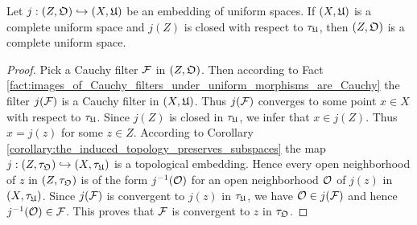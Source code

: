 \begin{theorem}\label{theorem:closed_embeddings_into_complete_space_are_complete}
Let $j:\left(Z,{\mathfrak O} \right) \hookrightarrow \left(X,{\mathfrak U}\right)$ be an embedding of uniform spaces. If $\left(X,{\mathfrak U}\right)$ is a complete uniform space and $j(Z)$ is closed with respect to $\tau_{{\mathfrak U}}$, then $\left(Z,{\mathfrak O}\right)$ is a complete uniform space.
\end{theorem}
\begin{proof}
Pick a Cauchy filter ${\mathcal F}$ in $\left(Z,{\mathfrak O}\right)$. Then according to Fact \ref{fact:images_of_Cauchy_filters_under_uniform_morphisms_are_Cauchy} the filter $j({\mathcal F})$ is a Cauchy filter in $\left(X,{\mathfrak U}\right)$. Thus $j({\mathcal F})$ converges to some point $x\in X$ with respect to $\tau_{{\mathfrak U}}$. Since $j(Z)$ is closed in $\tau_{{\mathfrak U}}$, we infer that $x \in j(Z)$. Thus $x = j(z)$ for some $z\in Z$. According to Corollary \ref{corollary:the_induced_topology_preserves_subspaces} the map $j:\left(Z,\tau_{{\mathfrak O}}\right) \hookrightarrow \left(X,\tau_{{\mathfrak U}}\right)$ is a topological embedding. Hence every open neighborhood of $z$ in $\left(Z,\tau_{{\mathfrak O}}\right)$ is of the form $j^{-1}({\mathcal O})$ for an open neighborhood ${\mathcal O}$ of $j(z)$ in $\left(X,\tau_{{\mathfrak U}}\right)$. Since $j({\mathcal F})$ is convergent to $j(z)$ in $\tau_{{\mathfrak U}}$, we have ${\mathcal O} \in j({\mathcal F})$ and hence $j^{-1}({\mathcal O}) \in {\mathcal F}$. This proves that ${\mathcal F}$ is convergent to $z$ in $\tau_{{\mathfrak O}}$.
\end{proof}

